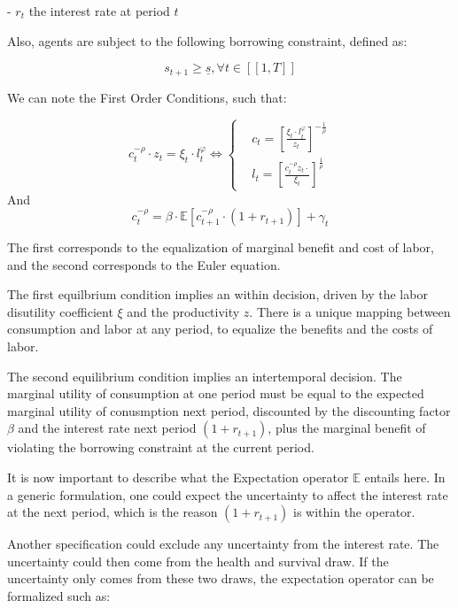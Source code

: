 \documentclass{article}
\begin{document}
-  $r_{t}$ the interest rate at period $t$

Also, agents are subject to the following borrowing constraint, defined as: 

$$s_{t+1}\geq \underline{s}, \forall t \in [\![1,T]\!]$$


We can note the First Order Conditions, such that: 

\begin{equation}
    c^{-\rho}_{t}\cdot z_{t} = \xi_{t}\cdot l_{t}^{\varphi} \iff
        \begin{cases}
        & c_t = \left[\frac{\xi_{t}\cdot l_{t}^{\varphi}}{z_{t}}\right]^{-\frac{1}{\rho}}\\ 
        & l_{t} = \left[\frac{c_{t}^{-\rho}z_{t}\cdot}{\xi_{t}}\right]^{\frac{1}{\rho}}
    \end{cases}
\end{equation}
And 
\begin{equation}
    c^{-\rho}_{t} = \beta \cdot \mathbb{E}\left[c^{-\rho}_{t+1}\cdot (1+r_{t+1})\right] + \gamma_{t}
\end{equation}

The first corresponds to the equalization of marginal benefit and
cost of labor, and the second corresponds to the Euler equation.

The first equilbrium condition implies an within decision,
driven by the labor disutility coefficient $\xi$ and the productivity $z$.
There is a unique mapping between consumption and labor at any period, to 
equalize the benefits and the costs of labor.

The second equilibrium condition implies an intertemporal decision.
The marginal utility of consumption at one period must be equal to the 
expected marginal utility of conusmption next period, discounted by 
the discounting factor $\beta$ and the interest rate next period $(1+r_{t+1})$, 
plus the marginal benefit of violating the borrowing constraint at the current period. 

It is now important to describe what the Expectation operator $\mathbb{E}$ entails here. 
In a generic formulation, one could expect the uncertainty to affect the interest rate at the next period, 
which is the reason $(1+r_{t+1})$ is within the operator.

Another specification could exclude any uncertainty from 
the interest rate. 
The uncertainty could then come from the health and survival draw. 
If the uncertainty only comes from these two draws, the expectation operator can be formalized such as: 
\end{document}

